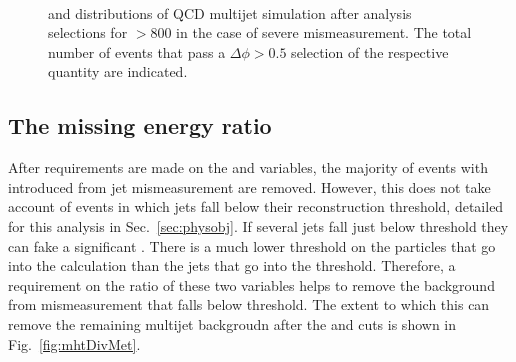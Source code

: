 \begin{figure}[!h]
 \centering
  \\
 \caption{\bdphi and \dphimhtj distributions of QCD multijet simulation
 after analysis selections for \scalht $> 800$ \GeV in the case of
 severe mismeasurement. The
 total number of events that pass a $\Delta\phi > 0.5$ selection of the
 respective quantity are indicated. }
 \label{fig:bDPhi_mismeasured}
\end{figure}

\subsection{The missing energy ratio \mhtmet}
\label{sec:mhtmet}

After requirements are made on the \alphat and \bdphi variables, the
majority of events with \MHT introduced from jet mismeasurement are
removed. However, this does not take account of events in which jets
fall below their reconstruction threshold, detailed for this analysis
in Sec.~\ref{sec:physobj}. If several jets fall just below threshold
they can fake a significant \MHT. There is a much lower threshold
on the particles that go into the \MET calculation than the jets that
go into the \MHT threshold. Therefore, a requirement on the ratio of
these two variables helps to remove the background from mismeasurement
that falls below threshold. The extent to which this can remove the
remaining \QCD multijet backgroudn after the \alphat and \bdphi cuts
is shown in Fig.~\ref{fig:mhtDivMet}.

